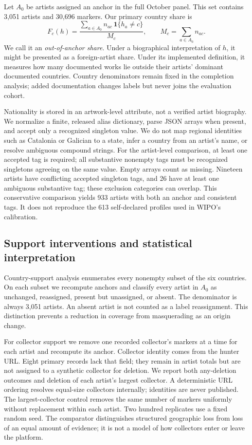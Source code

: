 Let $A_0$ be artists assigned an anchor in the full October panel. This set contains 3,051 artists and 30,696 markers. Our primary country share is
\begin{equation}
 F_c(h)=\frac{\sum_{a\in A_0}n_{ac}\,\mathbf{1}\{h_a\ne c\}}{M_c},\qquad
 M_c=\sum_{a\in A_0}n_{ac}.
 \label{eq:share}
\end{equation}
We call it an \emph{out-of-anchor share}. Under a biographical interpretation of $h$, it might be presented as a foreign-artist share. Under its implemented definition, it measures how many documented works lie outside their artists' dominant documented countries. Country denominators remain fixed in the completion analysis; added documentation changes labels but never joins the evaluation cohort.

Nationality is stored in an artwork-level attribute, not a verified artist biography. We normalize a finite, released alias dictionary, parse JSON arrays when present, and accept only a recognized singleton value. We do not map regional identities such as Catalonia or Galician to a state, infer a country from an artist's name, or resolve ambiguous compound strings. For the artist-level comparison, at least one accepted tag is required; all substantive nonempty tags must be recognized singletons agreeing on the same value. Empty arrays count as missing. Nineteen artists have conflicting accepted singleton tags, and 26 have at least one ambiguous substantive tag; these exclusion categories can overlap. This conservative comparison yields 933 artists with both an anchor and consistent tags. It does not reproduce the 613 self-declared profiles used in WIPO's calibration.

\subsection{Support interventions and statistical interpretation}
Country-support analysis enumerates every nonempty subset of the six countries. On each subset we recompute anchors and classify every artist in $A_0$ as unchanged, reassigned, present but unassigned, or absent. The denominator is always 3,051 artists. An absent artist is not counted as a label reassignment. This distinction prevents a reduction in coverage from masquerading as an origin change.

For collector support we remove one recorded collector's markers at a time for each artist and recompute its anchor. Collector identity comes from the hunter URL. Eight primary records lack that field; they remain in artist totals but are not assigned to a synthetic collector for deletion. We report both any-deletion outcomes and deletion of each artist's largest collector. A deterministic URL ordering resolves equal-size collectors internally; identities are never published. The largest-collector control removes the same number of markers uniformly without replacement within each artist. Two hundred replicates use a fixed random seed. The comparator distinguishes structured geographic loss from loss of an equal amount of evidence; it is not a model of how collectors enter or leave the platform.

